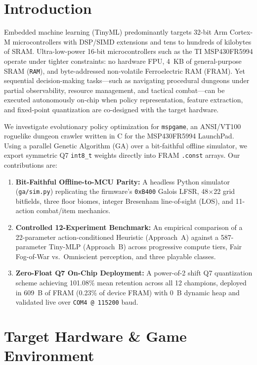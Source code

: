 \documentclass[conference]{IEEEtran}
\begin{document}
\section{Introduction}
Embedded machine learning (TinyML) predominantly targets 32-bit Arm Cortex-M microcontrollers with DSP/SIMD extensions and tens to hundreds of kilobytes of SRAM. Ultra-low-power 16-bit microcontrollers such as the TI MSP430FR5994 operate under tighter constraints: no hardware FPU, 4~KB of general-purpose SRAM (\texttt{RAM}), and byte-addressed non-volatile Ferroelectric RAM (FRAM). Yet sequential decision-making tasks---such as navigating procedural dungeons under partial observability, resource management, and tactical combat---can be executed autonomously on-chip when policy representation, feature extraction, and fixed-point quantization are co-designed with the target hardware.

We investigate evolutionary policy optimization for \texttt{mspgame}, an ANSI/VT100 roguelike dungeon crawler written in C for the MSP430FR5994 LaunchPad. Using a parallel Genetic Algorithm (GA) over a bit-faithful offline simulator, we export symmetric Q7 \texttt{int8\_t} weights directly into FRAM \texttt{.const} arrays. Our contributions are:
\begin{enumerate}
    \item \textbf{Bit-Faithful Offline-to-MCU Parity:} A headless Python simulator (\texttt{ga/sim.py}) replicating the firmware's \texttt{0xB400} Galois LFSR, 48$\times$22 grid bitfields, three floor biomes, integer Bresenham line-of-sight (LOS), and 11-action combat/item mechanics.
    \item \textbf{Controlled 12-Experiment Benchmark:} An empirical comparison of a 22-parameter action-conditioned Heuristic (Approach~A) against a 587-parameter Tiny-MLP (Approach~B) across progressive compute tiers, Fair Fog-of-War vs.\ Omniscient perception, and three playable classes.
    \item \textbf{Zero-Float Q7 On-Chip Deployment:} A power-of-2 shift Q7 quantization scheme achieving 101.08\% mean retention across all 12 champions, deployed in 609~B of FRAM (0.23\% of device FRAM) with 0~B dynamic heap and validated live over \texttt{COM4 @ 115200} baud.
\end{enumerate}

\section{Target Hardware \& Game Environment}
\end{document}
